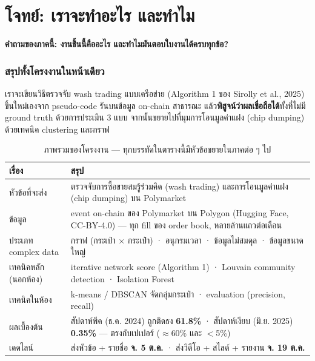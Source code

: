 \documentclass[11pt,a4paper]{article}
\newcommand{\sansall}{\sffamily}
\newcommand{\thd}[1]{\sansall\bfseries #1}
\begin{document}
\setcounter{tocdepth}{1}
{\hypersetup{allcolors=ink}
\renewcommand{\contentsname}{สารบัญ}
\tableofcontents}
\clearpage

\part{โจทย์: เราจะทำอะไร และทำไม}

\textbf{คำถามของภาคนี้: งานชิ้นนี้คืออะไร และทำไมมันตอบใบงานได้ครบทุกข้อ?}

\section{สรุปทั้งโครงงานในหน้าเดียว}

\begin{keybox}[title={ประโยคเดียวที่ต้องจำ: ``ราวหนึ่งในสี่ของ volume บน Polymarket อาจเป็นของปลอม'' --- เราจะวัดเองว่าจริงไหม}]
เราจะเขียนวิธีตรวจจับ wash trading แบบเครือข่าย (Algorithm 1 ของ Sirolly et al., 2025)
ขึ้นใหม่เองจาก pseudo-code รันบนข้อมูล on-chain สาธารณะ
แล้ว\textbf{พิสูจน์ว่าผลเชื่อถือได้}ทั้งที่ไม่มี ground truth
ด้วยการประเมิน 3 แบบ จากนั้นขยายไปที่มุมการโอนมูลค่าแฝง (chip dumping)
ด้วยเทคนิค clustering และกราฟ
\end{keybox}

\begin{table}[H]
\centering\small
\begin{tabular}{L{3.2cm}L{11.4cm}}
\toprule
\thd{เรื่อง} & \thd{สรุป} \\
\midrule
หัวข้อที่จะส่ง & ตรวจจับการซื้อขายสมรู้ร่วมคิด (wash trading) และการโอนมูลค่าแฝง (chip dumping) บน Polymarket \\
\addlinespace
ข้อมูล & event on-chain ของ Polymarket บน Polygon (Hugging Face, CC-BY-4.0) --- ทุก fill ของ order book, หลายล้านแถวต่อเดือน \\
\addlinespace
ประเภท complex data & กราฟ (กระเป๋า $\times$ กระเป๋า) · อนุกรมเวลา · ข้อมูลไม่สมดุล · ข้อมูลขนาดใหญ่ \\
\addlinespace
เทคนิคหลัก (นอกห้อง) & iterative network score (Algorithm 1) · Louvain community detection · Isolation Forest \\
\addlinespace
เทคนิคในห้อง & k-means / DBSCAN จัดกลุ่มกระเป๋า · evaluation (precision, recall) \\
\addlinespace
ผลเบื้องต้น & สัปดาห์พีค (ธ.ค. 2024) ถูกติดธง \textbf{61.8\%} · สัปดาห์เงียบ (มิ.ย. 2025) \textbf{0.35\%} --- ตรงกับเปเปอร์ ($\approx$60\% และ $<$5\%) \\
\addlinespace
เดดไลน์ & ส่งหัวข้อ + รายชื่อ \textbf{จ. 5 ต.ค.} · ส่งวิดีโอ + สไลด์ + รายงาน \textbf{จ. 19 ต.ค.} \\
\bottomrule
\end{tabular}
\caption{ภาพรวมของโครงงาน --- ทุกบรรทัดในตารางนี้มีหัวข้อขยายในภาคต่อ ๆ ไป}
\end{table}
\end{document}
